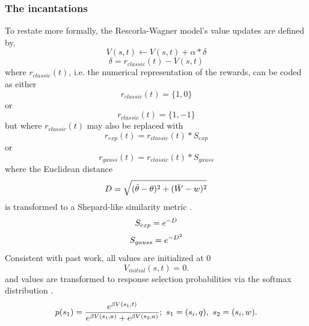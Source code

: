 \documentclass[doc,12pt]{apa}        %
\begin{document}
\subsubsection{The incantations}
\label{subsub:incantations}
To restate more formally, the Rescorla-Wagner model's value updates are defined by,
\begin{equation} \label{eq:V} V(s,t) \leftarrow V(s,t) + \alpha*\delta \end{equation} 
\begin{equation} \label{eq:rpe} \delta = r_{classic}(t) - V(s,t) \end{equation}
where $r_{classic}(t)$, i.e. the numerical representation of the rewards, can be coded as either
\begin{equation}
	\label{eq:r1}
	r_{classic}(t) = \{1,0\}
\end{equation}
or 
\begin{equation}
	\label{eq:r2}
	r_{classic}(t) = \{1,-1\}
\end{equation}
but where $r_{classic}(t)$ may also be replaced with
\begin{equation}
	\label{eq:re}
    r_{exp}(t) = r_{classic}(t) * S_{exp}
\end{equation}
or
\begin{equation}
	\label{eq:rg}
    r_{gauss}(t) = r_{classic}(t) * S_{gauss}
\end{equation}
where the Euclidean distance
\begin{equation}
	\label{eq:D}\\
    D = \sqrt{(\bar{\theta} - \theta)^2 + (\bar{W}-w)^2}
\end{equation}
is transformed to a Shepard-like similarity metric \cite{Shepard:1987p9102}.
\begin{equation}
	\label{eq:Sexp}\\
    S_{exp} = e^{-D}
\end{equation}
\begin{equation}
	\label{eq:Sgauss}\\
    S_{gauss} = e^{-D^2}
\end{equation}
Consistent with past work, all values are initialized at 0 \cite{Beierholm:2011p8141,BischoffGrethe:2009p4570,Gershman:2009p7207}
\begin{equation} \label{eq:V0} V_{initial}(s,t) = 0. \end{equation}
and values are transformed to response selection probabilities via the softmax distribution \cite{Sutton:1998p9247,ODoherty:2003p6329}.
\begin{equation}
	\label{eq:softmax}
	p(s_1) = {e^{\beta V(s_1,t)}\over{e^{\beta V(s_1,a)} + e^{\beta V(s_2,a)}}};\ s_1 = (s_{i},q), \ s_2 = (s_{i}, w).
\end{equation}
\end{document}
